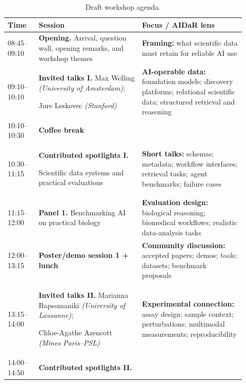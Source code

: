 \documentclass[10pt]{article}
\begin{document}
\vspace{-6mm}
\begin{table}[htb!]
\centering
\scriptsize

\caption{Draft workshop agenda.}
\setlength{\tabcolsep}{4pt}
\renewcommand{\arraystretch}{1.12}
\begin{tabular}{@{}p{0.12\linewidth}p{0.4\linewidth}p{0.4\linewidth}@{}}
\toprule
\textbf{Time} & \textbf{Session} & \textbf{Focus / AIDaR lens} \\
\midrule

08:45--09:10 &
\textbf{Opening.} Arrival, question wall, opening remarks, and workshop themes &
\textbf{Framing:} what scientific data must retain for reliable AI use \\

09:10--10:10 &
\textbf{Invited talks I.} Max Welling \textit{(University of Amsterdam)}; 

Jure Leskovec \textit{(Stanford)} &
\textbf{AI-operable data:} foundation models; discovery platforms; relational scientific data; structured retrieval and reasoning \\

10:10--10:30 &
\textbf{Coffee break}  &  \\


10:30--11:15 &
\textbf{Contributed spotlights I.} 

Scientific data systems and practical evaluations &
\textbf{Short talks:} schemas; metadata; workflow interfaces; retrieval tasks; agent benchmarks; failure cases \\

11:15--12:00 &
\textbf{Panel 1.} Benchmarking AI on practical biology &
\textbf{Evaluation design:} biological reasoning; biomedical workflows; realistic data-analysis tasks \\

12:00--13:15 &
\textbf{Poster/demo session 1 + lunch} &
\textbf{Community discussion:} accepted papers; demos; tools; datasets; benchmark proposals \\

13:15--14:00 &
\textbf{Invited talks II.}  Marianna Rapsomaniki \textit{(University of Lausanne)}; 

Chloe-Agathe Azencott \textit{(Mines Paris--PSL)} &
\textbf{Experimental connection:} assay design; sample context; perturbations; multimodal measurements; reproducibility \\

14:00--14:50 &
\textbf{Contributed spotlights II.} 


\end{tabular}
\end{table}
\end{document}
